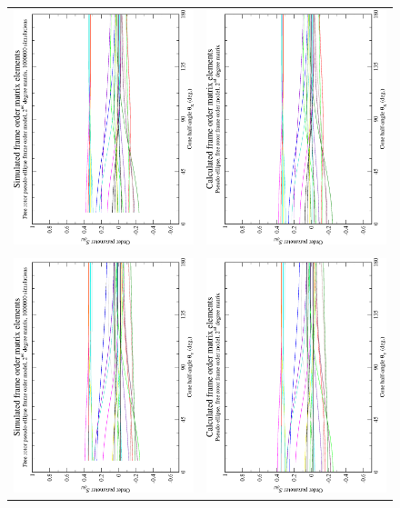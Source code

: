 \begin{figure}
\centering
  \begin{tabular}{@{}cc@{}}
    \includegraphics[width=.35\textwidth,angle=270]{images/frame_order_matrix/Sijkl_pseudo-ellipse_free_rotor_out_of_frame_theta_x_ens1000000.eps} &
    \includegraphics[width=.35\textwidth,angle=270]{images/frame_order_matrix/Sijkl_pseudo-ellipse_free_rotor_out_of_frame_theta_x_calc.eps} \\
    \\[-5pt]
    \includegraphics[width=.35\textwidth,angle=270]{images/frame_order_matrix/Sijkl_pseudo-ellipse_free_rotor_out_of_frame_theta_y_ens1000000.eps} &
    \includegraphics[width=.35\textwidth,angle=270]{images/frame_order_matrix/Sijkl_pseudo-ellipse_free_rotor_out_of_frame_theta_y_calc.eps} \\

\end{tabular}
\end{figure}
